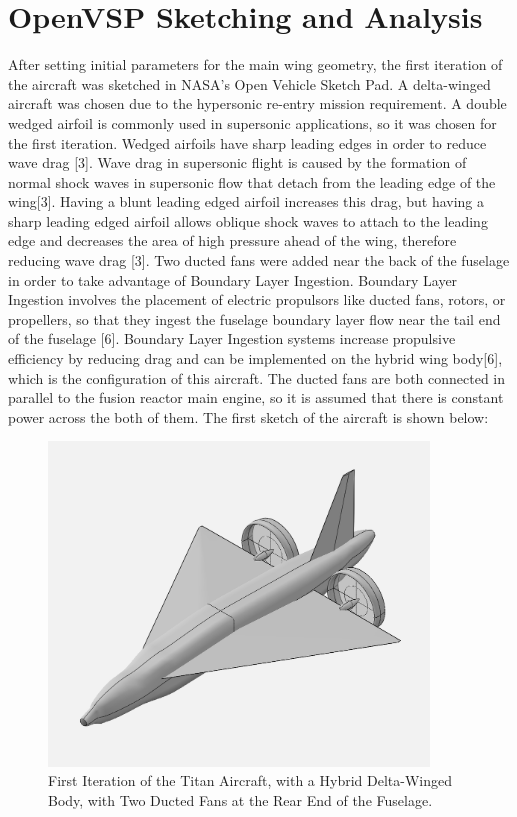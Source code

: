 \documentclass{article}
\begin{document}
\section{OpenVSP Sketching and Analysis}
\label{sec:OpenVSP Sketching and Analysis}
After setting initial parameters for the main wing geometry, the first iteration of the aircraft was sketched in NASA's Open Vehicle Sketch Pad. A delta-winged aircraft was chosen due to the hypersonic re-entry mission requirement. A double wedged airfoil is commonly used in supersonic applications, so it was chosen for the first iteration. Wedged airfoils have sharp leading edges in order to reduce wave drag [3]. Wave drag in supersonic flight is caused by the formation of normal shock waves in supersonic flow that detach from the leading edge of the wing[3]. Having a blunt leading edged airfoil increases this drag, but having a sharp leading edged airfoil allows oblique shock waves to attach to the leading edge and decreases the area of high pressure ahead of the wing, therefore reducing wave drag [3]. Two ducted fans were added near the back of the fuselage in order to take advantage of Boundary Layer Ingestion. Boundary Layer Ingestion involves the placement of electric propulsors like ducted fans, rotors, or propellers, so that they ingest the fuselage boundary layer flow near the tail end of the fuselage [6]. Boundary Layer Ingestion systems increase propulsive efficiency by reducing drag and can be implemented on the hybrid wing body[6], which is the configuration of this aircraft. The ducted fans are both connected in parallel to the fusion reactor main engine, so it is assumed that there is constant power across the both of them. The first sketch of the aircraft is shown below: 

\begin{figure}[H]
    \centering
    \includegraphics[width=0.90\textwidth]{Figures/TitanLanderInitialIsoView.png}
    \caption[First Iteration of the Titan Aircraft, with a Hybrid Delta-Winged Body, Two Ducted Fans at the Rear End of the Fuselage]{First Iteration of the Titan Aircraft, with a Hybrid Delta-Winged Body, with Two Ducted Fans at the Rear End of the Fuselage. \label{fig:TitanLanderv1} }
\end{figure} 
\end{document}
